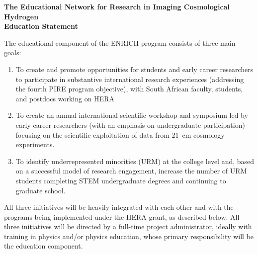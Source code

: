 \documentclass[preprint,11pt]{aastex}
\begin{document}
\clearpage
\setcounter{page}{1}

\setlength{\parindent}{0cm}
\textbf{\large The Educational Network for Research in Imaging Cosmological Hydrogen}\\
\textbf{Education Statement}
\vspace{6pt}
\setlength{\parindent}{17pt}

The educational component of the ENRICH program consists of three main goals:

\begin{enumerate}
\item To create and promote opportunities for students and early career researchers to participate in substantive international research experiences (addressing the fourth PIRE program objective), 
with South African faculty, students, and postdocs working on HERA

\item To create an annual international scientific workshop and symposium led by early career researchers (with an emphasis on undergraduate participation) focusing on the scientific exploitation of data from 21\, cm cosmology experiments.

\item To identify underrepresented minorities (URM) at the college level and, based on a successful model of research engagement, increase the number of URM students completing STEM undergraduate degrees and continuing to graduate school.
\end{enumerate}

All three initiatives will be heavily integrated with each other and with the programs being implemented under the HERA grant, as described below.  
All three initiatives will be directed by a full-time project administrator, ideally with training in physics and/or physics education, whose primary responsibility will be the education component.  
\end{document}
